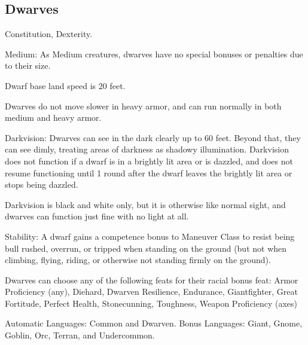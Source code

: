\subsection{Dwarves}
\begin{itemize*}
\item {} Constitution,  Dexterity.
\item Medium: As Medium creatures, dwarves have no special bonuses or penalties due to their size.
\item Dwarf base land speed is 20 feet.
\item Dwarves do not move slower in heavy armor, and can run normally in both medium and heavy armor.
\item Darkvision: Dwarves can see in the dark clearly up to 60 feet.   Beyond that, they can see dimly, treating areas of darkness as shadowy illumination. Darkvision does not function if a dwarf is in a brightly lit area or is dazzled, and does not resume functioning until 1 round after the dwarf leaves the brightly lit area or stops being dazzled.
\par Darkvision is black and white only, but it is otherwise like normal sight, and dwarves can function just fine with no light at all.
\item Stability: A dwarf gains a  competence bonus to Maneuver Class to resist being bull rushed, overrun, or tripped when standing on the ground (but not when climbing, flying, riding, or otherwise not standing firmly on the ground).
\item Dwarves can choose any of the following feats for their racial bonus feat: Armor Proficiency (any), Diehard, Dwarven Resilience, Endurance, Giantfighter, Great Fortitude, Perfect Health, Stonecunning, Toughness, Weapon Proficiency (axes)
\item Automatic Languages: Common and Dwarven. Bonus Languages: Giant, Gnome, Goblin, Orc, Terran, and Undercommon.
\end{itemize*}

